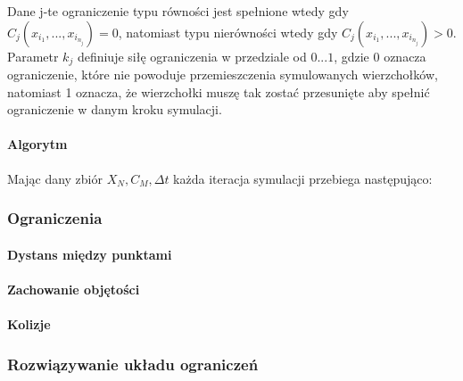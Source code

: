 Dane j-te ograniczenie typu równości jest spełnione wtedy gdy $C_j(x_{i_1},...,
		x_{i_{n_j}}) = 0$, natomiast typu nierówności wtedy gdy $C_j(x_{i_1},...,
		x_{i_{n_j}}) > 0$. Parametr $k_j$ definiuje siłę ograniczenia w
		przedziale od $0...1$, gdzie 0 oznacza ograniczenie, które nie powoduje
		przemieszczenia symulowanych wierzchołków, natomiast 1 oznacza, że
		wierzchołki muszę tak zostać przesunięte aby spełnić ograniczenie w
		danym kroku symulacji.
\paragraph{Algorytm}
Mając dany zbiór ${X_N, C_M, \Delta t}$ każda iteracja symulacji przebiega
następująco:


\subsubsection{Ograniczenia}
\paragraph{Dystans między punktami}
\paragraph{Zachowanie objętości}
\paragraph{Kolizje}
\subsubsection{Rozwiązywanie układu ograniczeń}

